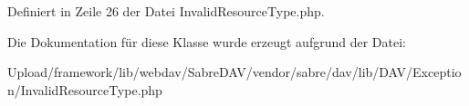 Definiert in Zeile 26 der Datei Invalid\+Resource\+Type.\+php.



Die Dokumentation für diese Klasse wurde erzeugt aufgrund der Datei\+:\begin{DoxyCompactItemize}
\item 
Upload/framework/lib/webdav/\+Sabre\+D\+A\+V/vendor/sabre/dav/lib/\+D\+A\+V/\+Exception/Invalid\+Resource\+Type.\+php\end{DoxyCompactItemize}
